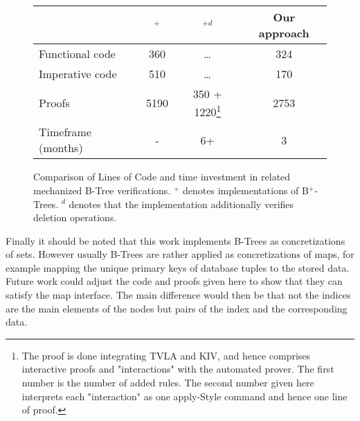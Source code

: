 \begin{figure}
    \centering
    \begin{tabular}{l|c|c|c}
        \                & \parencite{DBLP:conf/popl/MalechaMSW10}$^{+}$ & \parencite{DBLP:journals/sosym/ErnstSR15}$^{+d}$ & Our approach \\
        \hline
        Functional code &   360      & \dots                 & 324  \\
        Imperative code &   510      & \dots                 & 170  \\
        Proofs          &  5190      & 350 + 1220\footnote{
            The proof is done integrating TVLA and KIV, and hence comprises
            interactive proofs and "interactions" with the automated prover.
            The first number is the number of added rules.
            The second number given here interprets each "interaction" as one apply-Style
            command and hence one line of proof.
        } & 2753 \\
        Timeframe (months) &  -     & 6+                      & 3   \\
    \end{tabular}
    \caption{Comparison of Lines of Code and time investment in related mechanized B-Tree verifications.
    $^+$ denotes implementations of B$^+$-Trees.
    $^d$ denotes that the implementation additionally verifies deletion operations.
    }
    \label{fig:proof-comparison}
\end{figure}

Finally it should be noted that this work implements B-Trees as
concretizations of sets.
However usually B-Trees are rather applied as concretizations
of maps, for example mapping the unique primary keys
of database tuples to the stored data.
Future work could adjust the code and proofs given here
to show that they can satisfy the map interface.
The main difference would then be that not the indices
are the main elements of the nodes but pairs of the 
index and the corresponding data.